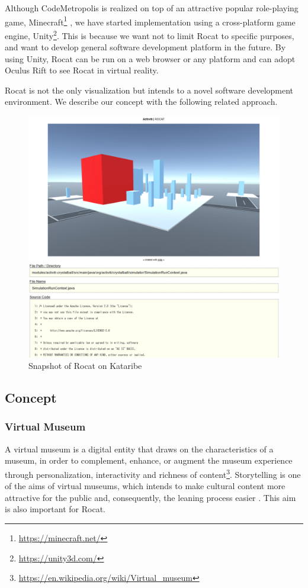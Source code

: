 \documentclass[conference]{IEEEtran}
\begin{document}
Although CodeMetropolis is realized on top of an attractive popular role-playing game, Minecraft\footnote{\url{https://minecraft.net/}} \cite{6648194}, we have started implementation using a cross-platform game engine, Unity\footnote{\url{https://unity3d.com/}}.
This is because we want not to limit Rocat to specific purposes, and want to develop general software development platform in the future.
By using Unity, Rocat can be run on a web browser or any platform and can adopt Oculus Rift to see Rocat in virtual reality.

Rocat is not the only visualization but intends to a novel software development environment.
We describe our concept with the following related approach.

\begin{figure}[tb]
\centering
\includegraphics[width=\linewidth]{Rocat-on-kataribe2.pdf}
\caption{Snapshot of Rocat on Kataribe}
\label{figure:Rocat-on-kataribe}
\end{figure}


\subsection{Concept}
\subsubsection{Virtual Museum}
A virtual museum is a digital entity that draws on the characteristics of a museum, in order to complement, enhance, or augment the museum
experience through personalization, interactivity and richness of content\footnote{\url{https://en.wikipedia.org/wiki/Virtual_museum}}.
Storytelling is one of the aims of virtual museums, which intends to make cultural content more attractive for the public and, consequently, the leaning process easier \cite{Pietroni:2014:IVR:2635823.2611375}.
This aim is also important for Rocat.
\end{document}

